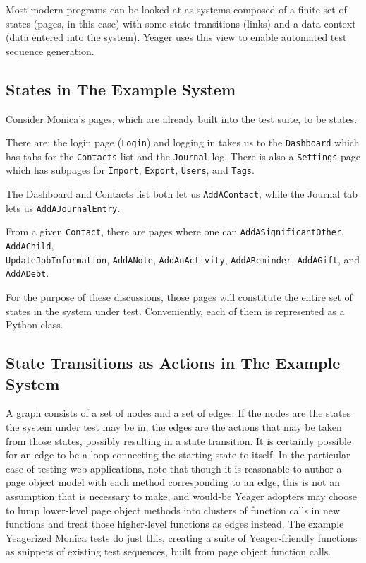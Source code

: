 Most modern programs can be looked at as systems composed of a finite set of states (pages, in this case) with some state transitions (links) and a data context (data entered into the system). Yeager uses this view to enable automated test sequence generation.

\subsection{States in The Example System}
Consider Monica's pages, which are already built into the test suite, to be states.

There are: the login page (\texttt{Login}) and logging in takes us to the \texttt{Dashboard} which has tabs for the \texttt{Contacts} list and the \texttt{Journal} log. There is also a \texttt{Settings} page which has subpages for \texttt{Import}, \texttt{Export}, \texttt{Users}, and \texttt{Tags}.

The Dashboard and Contacts list both let us \texttt{AddAContact}, while the Journal tab lets us \texttt{AddAJournalEntry}.

From a given \texttt{Contact}, there are pages where one can \texttt{AddASignificantOther}, \texttt{AddAChild}, \\\texttt{UpdateJobInformation}, \texttt{AddANote}, \texttt{AddAnActivity}, \texttt{AddAReminder}, \texttt{AddAGift}, and \texttt{AddADebt}.

For the purpose of these discussions, those pages will constitute the entire set of states in the system under test. Conveniently, each of them is represented as a Python class.


\subsection{State Transitions as Actions in The Example System}
A graph consists of a set of nodes and a set of edges. If the nodes are the states the system under test may be in, the edges are the actions that may be taken from those states, possibly resulting in a state transition. It is certainly possible for an edge to be a loop connecting the starting state to itself. In the particular case of testing web applications, note that though it is reasonable to author a page object model with each method corresponding to an edge, this is not an assumption that is necessary to make, and would-be Yeager adopters may choose to lump lower-level page object methods into clusters of function calls in new functions and treat those higher-level functions as edges instead. The example Yeagerized Monica tests do just this, creating a suite of Yeager-friendly functions as snippets of existing test sequences, built from page object function calls.

